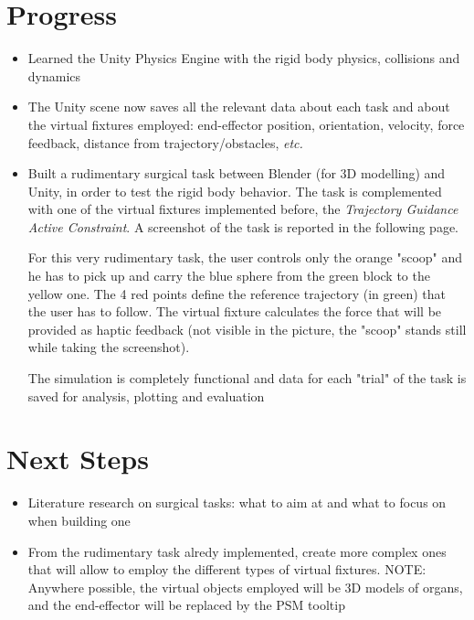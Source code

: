 \documentclass{article}
\begin{document}
\section*{Progress}
    \begin{itemize}
        \item Learned the Unity Physics Engine with the rigid body physics,
        collisions and dynamics
        \item The Unity scene now saves all the relevant data about each task
        and about the virtual fixtures employed: end-effector position,
        orientation, velocity, force feedback, distance from
        trajectory/obstacles, \textit{etc.}
        \item Built a rudimentary surgical task between Blender (for 3D
        modelling) and Unity, in order to test the rigid body behavior. The task
        is complemented with one of the virtual fixtures implemented before, the
        \textit{Trajectory Guidance Active Constraint}. A screenshot of the task
        is reported in the following page.
        
        For this very rudimentary task, the user controls only the orange
        "scoop" and he has to pick up and carry the blue sphere from the green
        block to the yellow one. The 4 red points define the reference 
        trajectory (in green)
        that the user has to follow. The virtual fixture calculates the force
        that will be provided as haptic feedback (not visible in the picture, the "scoop" stands still while taking the screenshot).
        
        The simulation is completely functional and data for each "trial" of the
        task is saved for analysis, plotting and evaluation
        
    \end{itemize}
    
    \section*{Next Steps}
    \begin{itemize}
        \item Literature research on surgical tasks: what to aim at and what to
        focus on when building one
        \item From the rudimentary task alredy implemented, create more complex
        ones that will allow to employ the different types of virtual fixtures.
        \newline NOTE: Anywhere possible, the virtual objects employed will be 3D models
        of organs, and the end-effector will be replaced by the PSM tooltip
    \end{itemize}
    
\end{document}
